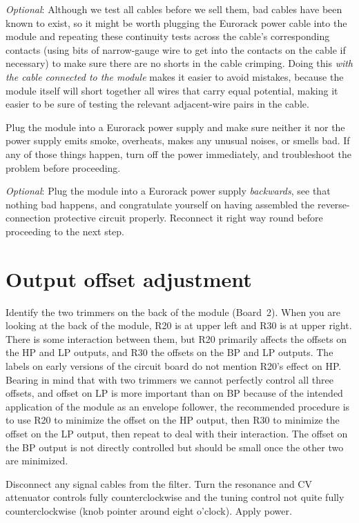 \emph{Optional}:  Although we test all cables before we sell them, bad
cables have been known to exist, so it might be worth plugging the Eurorack
power cable into the module and repeating these continuity tests across the
cable's corresponding contacts (using bits of narrow-gauge wire to get into
the contacts on the cable if necessary) to make sure there are no shorts in
the cable crimping.  Doing this \emph{with the cable connected to the
module} makes it easier to avoid mistakes, because the module itself will
short together all wires that carry equal potential, making it easier to be
sure of testing the relevant adjacent-wire pairs in the cable.

Plug the module into a Eurorack power supply and make sure
neither it nor the power supply emits smoke, overheats, makes any unusual
noises, or smells bad.  If any of those things happen, turn off the power
immediately, and troubleshoot the problem before proceeding.

\emph{Optional}: Plug the module into a Eurorack power supply
\emph{backwards}, see that nothing bad happens, and congratulate yourself on
having assembled the reverse-connection protective circuit properly. 
Reconnect it right way round before proceeding to the next step.

\section{Output offset adjustment}

Identify the two trimmers on the back of the module (Board~2).  When you are
looking at the back of the module, R20 is at upper left and R30 is at upper
right.  There is some interaction between them, but R20 primarily affects
the offsets on the HP and LP outputs, and R30 the offsets on the BP and LP
outputs.  The labels on early versions of the circuit board do not mention
R20's effect on HP.  Bearing in mind that with two trimmers we cannot
perfectly control all three offsets, and offset on LP is more important than
on BP because of the intended application of the module as an envelope
follower, the recommended procedure is to use R20 to minimize the offset on
the HP output, then R30 to minimize the offset on the LP output, then repeat
to deal with their interaction.  The offset on the BP output is not directly
controlled but should be small once the other two are minimized.

Disconnect any signal cables from the filter.  Turn the resonance and CV
attenuator controls fully counterclockwise and the tuning control not quite
fully counterclockwise (knob pointer around eight o'clock).  Apply
power.

